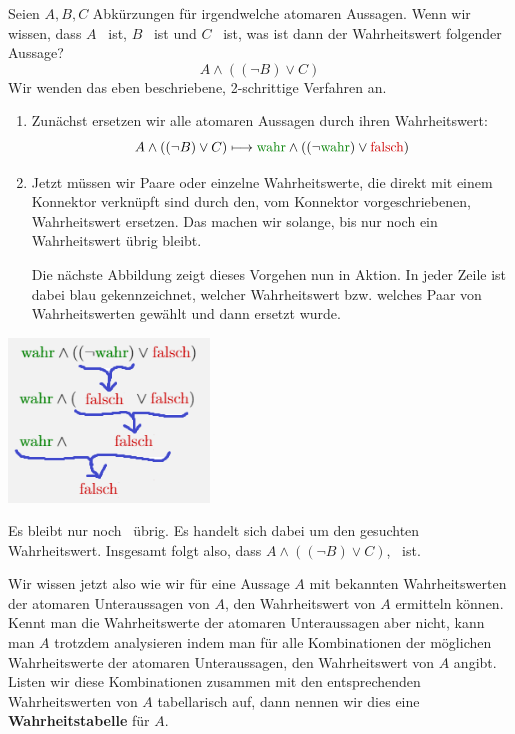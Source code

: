 \documentclass[../../main.tex]{subfiles}
\begin{document}
\begin{example}
Seien $A, B, C$ Abkürzungen für irgendwelche atomaren Aussagen. Wenn wir wissen, dass $A$ \wahr\  ist, $B$ \wahr\  ist und $C$ \falsch\   ist, was ist dann der Wahrheitswert folgender Aussage?
\[A \land ( (\lnot B) \lor C)\]
Wir wenden das eben beschriebene, 2-schrittige Verfahren an.
\begin{enumerate}
    \item Zunächst ersetzen wir alle atomaren Aussagen durch ihren Wahrheitswert:
    \[A \land ( (\lnot B) \lor C) \longmapsto  \wahr \land ((\lnot \wahr) \lor \falsch)\]
    \item Jetzt müssen wir Paare oder einzelne Wahrheitswerte, die direkt mit einem Konnektor verknüpft sind durch den, vom Konnektor vorgeschriebenen, Wahrheitswert ersetzen. Das machen wir solange, bis nur noch ein Wahrheitswert übrig bleibt.
    
    Die nächste Abbildung zeigt dieses Vorgehen nun in Aktion. In jeder Zeile ist dabei blau gekennzeichnet, welcher Wahrheitswert bzw. welches Paar von Wahrheitswerten gewählt und dann ersetzt wurde. 
\end{enumerate}
\begin{center}
\includegraphics[width=0.4\textwidth]{images/TEMP_wahrheitsalg.png}
\end{center}
Es bleibt nur noch \falsch\  übrig. Es handelt sich dabei um den gesuchten Wahrheitswert. Insgesamt folgt also, dass $A \land ( (\lnot B) \lor C)$, \falsch\  ist.
\end{example}
Wir wissen jetzt also wie wir für eine Aussage $A$ mit bekannten Wahrheitswerten der atomaren Unteraussagen von $A$, den Wahrheitswert von $A$ ermitteln können. Kennt man die Wahrheitswerte der atomaren Unteraussagen aber nicht, kann man $A$ trotzdem analysieren indem man für alle Kombinationen der möglichen Wahrheitswerte der atomaren Unteraussagen, den Wahrheitswert von $A$ angibt. Listen wir diese Kombinationen zusammen mit den entsprechenden Wahrheitswerten von $A$ tabellarisch auf, dann nennen wir dies eine \textbf{Wahrheitstabelle} für $A$. 
\end{document}
